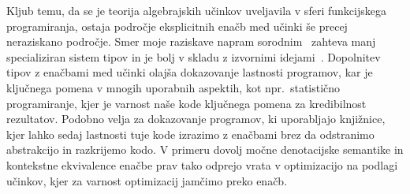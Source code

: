 \documentclass{article}
\begin{document}
Kljub temu, da se je teorija algebrajskih učinkov uveljavila v sferi funkcijskega programiranja, ostaja področje eksplicitnih enačb med učinki še precej neraziskano področje. Smer moje raziskave napram sorodnim~\cite{DBLP:journals/pacmpl/Ahman18} zahteva manj specializiran sistem tipov in je bolj v skladu z izvornimi idejami~\cite{DBLP:conf/esop/PlotkinP09}. Dopolnitev tipov z enačbami med učinki olajša dokazovanje lastnosti programov, kar je ključnega pomena v mnogih uporabnih aspektih, kot npr.\ statistično programiranje, kjer je varnost naše kode ključnega pomena za kredibilnost rezultatov. Podobno velja za dokazovanje programov, ki uporabljajo knjižnice, kjer lahko sedaj lastnosti tuje kode izrazimo z enačbami brez da odstranimo abstrakcijo in razkrijemo kodo. V primeru dovolj močne denotacijske semantike in kontekstne ekvivalence enačbe prav tako odprejo vrata v optimizacijo na podlagi učinkov, kjer za varnost optimizacij jamčimo preko enačb.

\renewcommand\refname{Literatura}


\end{document}
